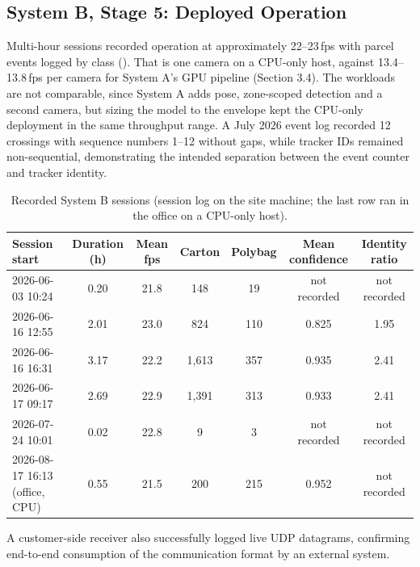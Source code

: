 \documentclass[9pt,a4paper,twocolumn]{rho-class/rho}
\begin{document}
\subsection{System B, Stage 5: Deployed Operation}

Multi-hour sessions recorded operation at approximately 22--23\,fps with parcel events logged by class (). That is one camera on a CPU-only host, against 13.4--13.8\,fps per camera for System A's GPU pipeline (Section 3.4). The workloads are not comparable, since System A adds pose, zone-scoped detection and a second camera, but sizing the model to the envelope kept the CPU-only deployment in the same throughput range. A July 2026 event log recorded 12 crossings with sequence numbers 1--12 without gaps, while tracker IDs remained non-sequential, demonstrating the intended separation between the event counter and tracker identity.

\begin{table}[tbp]
    \caption{Recorded System B sessions (session log on the site machine; the last row ran in the office on a CPU-only host).}
    \label{tab:t11}
    \centering
    \footnotesize
    \begin{tabular}{lcccccc}
    \toprule
    \textbf{Session start} & \textbf{Duration (h)} & \textbf{Mean fps} & \textbf{Carton} & \textbf{Polybag} & \textbf{Mean confidence} & \textbf{Identity ratio} \\
    \midrule
    2026-06-03 10:24 & 0.20 & 21.8 & 148 & 19 & not recorded & not recorded \\
    2026-06-16 12:55 & 2.01 & 23.0 & 824 & 110 & 0.825 & 1.95 \\
    2026-06-16 16:31 & 3.17 & 22.2 & 1{,}613 & 357 & 0.935 & 2.41 \\
    2026-06-17 09:17 & 2.69 & 22.9 & 1{,}391 & 313 & 0.933 & 2.41 \\
    2026-07-24 10:01 & 0.02 & 22.8 & 9 & 3 & not recorded & not recorded \\
    2026-08-17 16:13 (office, CPU) & 0.55 & 21.5 & 200 & 215 & 0.952 & not recorded \\
    \bottomrule
    \end{tabular}
\end{table}

A customer-side receiver also successfully logged live UDP datagrams, confirming end-to-end consumption of the communication format by an external system.
\end{document}
